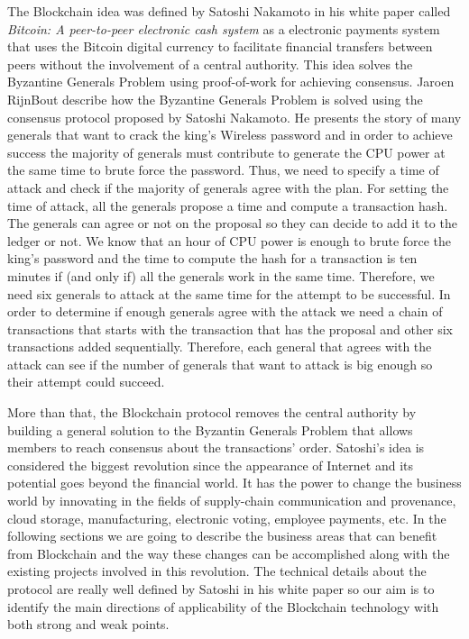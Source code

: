 The Blockchain idea was defined by Satoshi Nakamoto in his white paper called \emph{Bitcoin: A peer-to-peer electronic cash  system} \cite{bitcoinwhitepaper} as a electronic payments system that uses the Bitcoin digital currency to facilitate financial transfers between peers without the involvement of a central authority.
This idea solves the Byzantine Generals Problem using proof-of-work for achieving consensus. Jaroen RijnBout \cite{pow-byzantine} describe how the Byzantine Generals Problem is solved using the consensus protocol proposed by Satoshi Nakamoto. He presents the story of many generals that want to crack the king's Wireless password and in order to achieve success the majority of generals must contribute to generate the CPU power at the same time to brute force the password. Thus, we need to specify a time of attack and check if the majority of generals agree with the plan. For setting the time of attack, all the generals propose a time and compute a transaction hash. The generals can agree or not on the proposal so they can decide to add it to the ledger or not. We know that an hour of CPU power is enough to brute force the king's password and the time to compute the hash for a transaction is ten minutes if (and only if) all the generals work in the same time. Therefore, we need six generals to attack at the same time for the attempt to be successful. In order to determine if enough generals agree with the attack we need a chain of transactions that starts with the transaction that has the proposal and other six transactions added sequentially. Therefore, each general that agrees with the attack can see if the number of generals that want to attack is big enough so their attempt could succeed.

More than that, the Blockchain protocol removes the central authority by building a general solution to the Byzantin Generals Problem that allows members to reach consensus about the transactions' order.
Satoshi's idea is considered the biggest revolution since the appearance of Internet and its potential goes beyond the financial world. It has the power to change the business world by innovating in the fields of supply-chain communication and provenance, cloud storage, manufacturing, electronic voting, employee payments, etc.
In the following sections we are going to describe the business areas that can benefit from Blockchain and the way these changes can be accomplished along with the existing projects involved in this revolution.
The technical details about the protocol are really well defined by Satoshi in his white paper \cite{bitcoinwhitepaper} so our aim is to identify the main directions of applicability of the Blockchain technology with both strong and weak points. 

